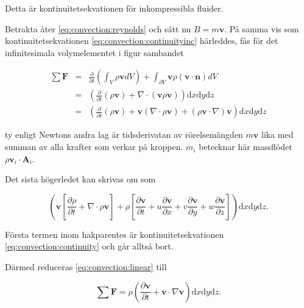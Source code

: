 Detta är kontinuitetsekvationen för inkompressibla fluider.

Betrakta åter \eqref{eq:convection:reynolds} och sätt nu $B = m\mathbf{v}$. På samma vis som kontinuitetsekvationen \eqref{eq:convection:continuityinc} härleddes, fås för det infinitesimala volymelementet i figur sambandet

\begin{eqnarray}
\label{eq:convection:linear}
\sum \mathbf{F} & = & \frac{\partial}{\partial t} \left( \int_V \rho\mathbf{v} dV \right) + \int_{\partial V} \mathbf{v}\rho\left( \mathbf{v} \cdot \mathbf{n}\right)dV \nonumber \\
& = &\left(\frac{\partial}{\partial t} \left( \rho\mathbf{v} \right) + \nabla \cdot \left( \mathbf{v} \rho \mathbf{v}\right)\right)\mathrm{d}x\mathrm{d}y\mathrm{d}z \nonumber\\
& = &\left( \frac{\partial}{\partial t} \left( \rho\mathbf{v} \right) + \mathbf{v}\left(\nabla\cdot\rho\mathbf{v}\right) + \left(\rho\mathbf{v} \cdot \nabla\right) \mathbf{v}\right) \mathrm{d}x\mathrm{d}y\mathrm{d}z
\end{eqnarray}

ty enligt Newtons andra lag är tidsderivatan av rörelsemängden $m\mathbf{v}$ lika med summan av alla krafter som verkar på kroppen. $\dot{m}_i$ betecknar här massflödet $\rho\mathbf{v}_i\cdot\mathbf{A}_i$.

Det sista högerledet kan skrivas om som

\begin{equation}
\left( \mathbf{v}\left[ \frac{\partial \rho}{\partial t} + \nabla\cdot \rho \mathbf{v}\right] + \rho\left[ \frac{\partial \mathbf{v}}{\partial t} + u\frac{\partial\mathbf{v}}{\partial x} + v\frac{\partial\mathbf{v}}{\partial y} + w\frac{\partial\mathbf{v}}{\partial z} \right]\right)\mathrm{d}x\mathrm{d}y\mathrm{d}z.
\end{equation}

Första termen inom hakparentes är kontinuitetsekvationen \eqref{eq:convection:continuity} och går alltså bort.

Därmed reduceras \eqref{eq:convection:linear} till

\begin{equation}
\label{eq:convection:linearfinal}
\sum \mathbf{F} = \rho \left( \frac{\partial \mathbf{v}}{\partial t} + \mathbf{v}\cdot \nabla\mathbf{v} \right)\mathrm{d}x\mathrm{d}y\mathrm{d}z.
\end{equation}

